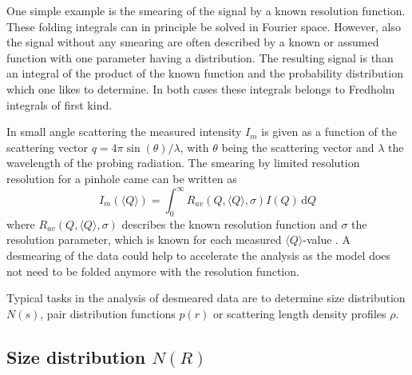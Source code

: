 One simple example is the smearing of the signal by a known resolution function. These folding integrals can in principle be solved in Fourier space. However, also the signal without any smearing are often described by a known or assumed function with one parameter having a distribution. The resulting signal is than an integral of the product of the known function and the probability distribution which one likes to determine. In both cases these integrals belongs to Fredholm integrals of first kind.

In small angle scattering the measured intensity $I_m$ is given as a function of the scattering vector $q=4\pi\sin(\theta)/\lambda$, with $\theta$ being the scattering vector and $\lambda$ the wavelength of the probing radiation. The smearing by limited resolution resolution for a pinhole came can be written as
\begin{equation} \label{eq:res}
I_m(\langle Q\rangle) = \int_0^\infty R_{av}\left(Q,\langle
Q\rangle,\sigma\right) I(Q) \, \mathrm{d}Q
\end{equation}
where $R_{av}\left(Q,\langle Q\rangle,\sigma\right)$ describes the known resolution function and $\sigma$ the resolution parameter, which is known for each measured $\langle Q\rangle$-value \cite{Pedersen1990}. A desmearing of the data could help to accelerate the analysis as the model does not need to be folded anymore with the resolution function.

Typical tasks in the analysis of desmeared data are to determine size distribution $N(s)$, pair distribution functions $p(r)$ or scattering length density profiles $\rho$.

\subsection{Size distribution $N(R)$}~\\
\label{sec:N(R)}


